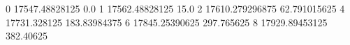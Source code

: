 0 17547.48828125 0.0
1 17562.48828125 15.0
2 17610.279296875 62.791015625
4 17731.328125 183.83984375
6 17845.25390625 297.765625
8 17929.89453125 382.40625
